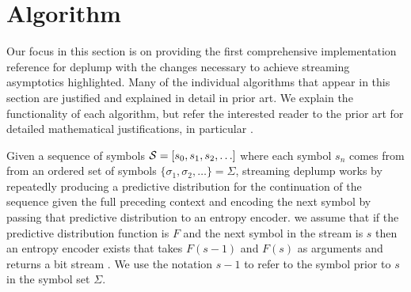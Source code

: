 \section{Algorithm}
%
%

Our focus in this section is on providing the first comprehensive implementation reference for deplump with the changes necessary to achieve streaming asymptotics highlighted.  Many of the individual algorithms that appear in this section are justified and explained in detail in prior art.  We explain the functionality of each algorithm, but refer the interested reader to the prior art for detailed mathematical justifications, in particular \citep{Wood2009,Gasthaus2010,Bartlett2010}.

Given a sequence of symbols $\Seq = [s_0, s_1, s_2, \ldots]$ where each symbol $s_n$ comes from from an ordered set of symbols $\{\sigma_1, \sigma_2, \ldots\} = \Sigma$,  streaming deplump works by repeatedly producing a predictive distribution for the continuation of the sequence given the full preceding context and encoding the next symbol by passing that predictive distribution to an entropy encoder. %
we assume that if the predictive distribution function is $F$ and the next symbol in the stream is $s$ then %
an entropy encoder exists that takes $F(s-1)$ and $F(s)$ as arguments and returns a bit stream \citep{Witten1987}. %
We use the notation $s-1$ to refer to the symbol prior to $s$ in the symbol set $\Sigma$.  %

